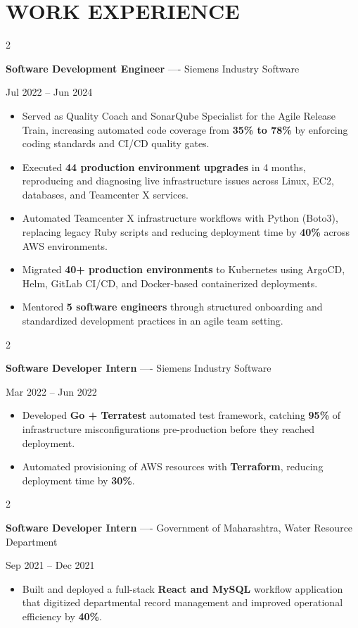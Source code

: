 \documentclass[10pt, letterpaper]{article}
\newenvironment{highlights}{
    \begin{itemize}[
        topsep=0.10 cm,
        parsep=0.06 cm,
        partopsep=0pt,
        itemsep=0.06 cm,
        leftmargin=12pt
    ]
}{
    \end{itemize}
}
\newenvironment{twocolentry}[2][]{
    \onecolentry
    \def\secondColumn{#2}
    \setcolumnwidth{\fill, 4.5 cm}
    \begin{paracol}{2}
}{
    \switchcolumn \raggedleft \secondColumn
    \end{paracol}
    \endonecolentry
}
\begin{document}
\section{WORK EXPERIENCE}
\begin{twocolentry}{Jul 2022 -- Jun 2024}
\textbf{Software Development Engineer} ---- Siemens Industry Software
\end{twocolentry}
\begin{highlights}
  \item Served as Quality Coach and SonarQube Specialist for the Agile Release Train, increasing automated code coverage from \textbf{35\% to 78\%} by enforcing coding standards and CI/CD quality gates.
  \item Executed \textbf{44 production environment upgrades} in 4 months, reproducing and diagnosing live infrastructure issues across Linux, EC2, databases, and Teamcenter X services.
  \item Automated Teamcenter X infrastructure workflows with Python (Boto3), replacing legacy Ruby scripts and reducing deployment time by \textbf{40\%} across AWS environments.
  \item Migrated \textbf{40+ production environments} to Kubernetes using ArgoCD, Helm, GitLab CI/CD, and Docker-based containerized deployments.
  \item Mentored \textbf{5 software engineers} through structured onboarding and standardized development practices in an agile team setting.
\end{highlights}

\vspace{0.15 cm}

\begin{twocolentry}{Mar 2022 -- Jun 2022}
\textbf{Software Developer Intern} ---- Siemens Industry Software
\end{twocolentry}
\begin{highlights}
  \item Developed \textbf{Go + Terratest} automated test framework, catching \textbf{95\%} of infrastructure misconfigurations pre-production before they reached deployment.
  \item Automated provisioning of AWS resources with \textbf{Terraform}, reducing deployment time by \textbf{30\%}.
\end{highlights}

\vspace{0.15 cm}

\begin{twocolentry}{Sep 2021 -- Dec 2021}
\textbf{Software Developer Intern} ---- Government of Maharashtra, Water Resource Department
\end{twocolentry}
\begin{highlights}
  \item Built and deployed a full-stack \textbf{React and MySQL} workflow application that digitized departmental record management and improved operational efficiency by \textbf{40\%}.
\end{highlights}
\end{document}
